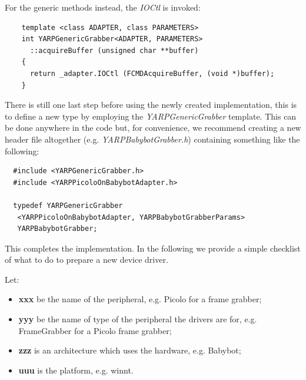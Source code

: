 For the generic methods instead, the {\em IOCtl} is invoked:
\begin{verbatim}
    template <class ADAPTER, class PARAMETERS>
    int YARPGenericGrabber<ADAPTER, PARAMETERS>
      ::acquireBuffer (unsigned char **buffer)
    {
      return _adapter.IOCtl (FCMDAcquireBuffer, (void *)buffer);
    }
\end{verbatim}

There is still one last step before using the newly created implementation, this is to define a new type by employing the {\em YARPGenericGrabber} template. This can be done anywhere in the code but, for convenience, we recommend creating a new header file altogether (e.g. {\em YARPBabybotGrabber.h}) containing something like the following:

\begin{verbatim}
  #include <YARPGenericGrabber.h>
  #include <YARPPicoloOnBabybotAdapter.h>

  typedef YARPGenericGrabber
   <YARPPicoloOnBabybotAdapter, YARPBabybotGrabberParams> 
   YARPBabybotGrabber;
\end{verbatim}

This completes the implementation. In the following we provide a simple checklist of what to do to prepare a new device driver.
 
 
Let:
\begin{itemize}
\item {\bf xxx} be the name of the peripheral, e.g. Picolo for a frame grabber;
\item {\bf yyy} be the name of type of the peripheral the drivers are for, e.g. FrameGrabber for a Picolo frame grabber;
\item {\bf zzz} is an architecture which uses the hardware, e.g. Babybot;
\item {\bf uuu} is the platform, e.g. winnt.
\end{itemize}

